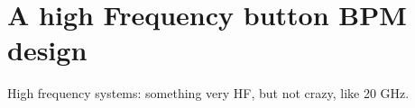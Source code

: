 \chapter[A high Frequency button BPM design]{A high Frequency button BPM design}

High frequency systems: something very HF, but not crazy, like 20 GHz.

